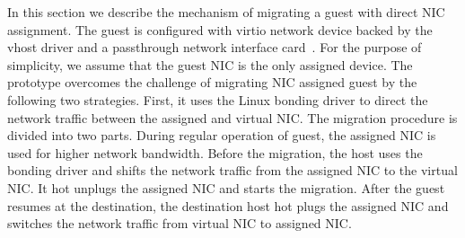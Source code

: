In this section we describe the mechanism of migrating a guest with 
direct NIC assignment. The guest is configured with virtio network 
device backed by the vhost driver and a passthrough network interface 
card~\cite{zhai:2008}. For the purpose of simplicity, we assume that the 
guest NIC is the only assigned device. The prototype overcomes 
the challenge of migrating NIC assigned guest by the following
two strategies. First, it uses the Linux bonding driver to
direct the network traffic between the assigned and virtual
NIC. The migration procedure is divided into two parts. During regular operation 
of guest, the assigned NIC is used for higher network bandwidth. 
Before the migration, the host uses the bonding driver and shifts the
network traffic from the assigned NIC to the virtual NIC. It
hot unplugs the assigned NIC and starts the migration. After
the guest resumes at the destination, the destination host hot
plugs the assigned NIC and switches the network traffic
from virtual NIC to assigned NIC. 

%

